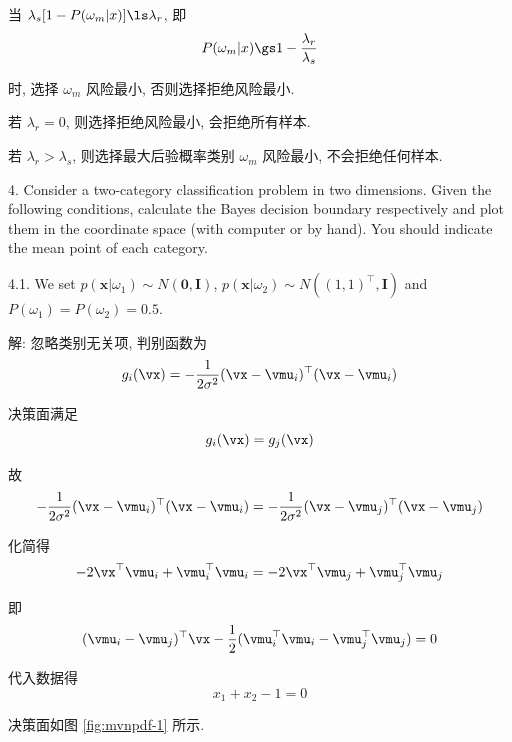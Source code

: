 \documentclass[openany]{ctexbook}
\theoremstyle{kaiti}
\theoremstyle{normal}
\begin{document}
当 $\lambda_s[1-P(\omega_m|x)]\ls\lambda_r$, 即
\begin{equation}
  P(\omega_m|x)\gs1-\frac{\lambda_r}{\lambda_s}
\end{equation}

时, 选择 $\omega_m$ 风险最小, 否则选择拒绝风险最小.

若 $\lambda_r=0$, 则选择拒绝风险最小, 会拒绝所有样本.

若 $\lambda_r>\lambda_s$, 则选择最大后验概率类别 $\omega_m$ 风险最小, 不会拒绝任何样本.

4. Consider a two-category classification problem in two dimensions. Given the following conditions, calculate the Bayes decision boundary respectively and plot them in the coordinate space (with computer or by hand). You should indicate the mean point of each category.

4.1. We set $p(\bm{x}|\omega_1)\sim N(\bm{0},\bm{I})$, $p(\bm{x}|\omega_2)\sim N\left((1,1)^{\top},\bm{I}\right)$ and $P(\omega_1)=P(\omega_2)=0.5$. 

解: 忽略类别无关项, 判别函数为
\begin{equation}
  g_i(\vx)=-\frac{1}{2\sigma^2}(\vx-\vmu_i)^{\top}(\vx-\vmu_i)
\end{equation}

决策面满足
\begin{equation}
  g_i(\vx)=g_j(\vx)
\end{equation}

故
\begin{equation}
  -\frac{1}{2\sigma^2}(\vx-\vmu_i)^{\top}(\vx-\vmu_i)=-\frac{1}{2\sigma^2}(\vx-\vmu_j)^{\top}(\vx-\vmu_j)
\end{equation}

化简得
\begin{equation}
  -2\vx^{\top}\vmu_i+\vmu_i^{\top}\vmu_i=-2\vx^{\top}\vmu_j+\vmu_j^{\top}\vmu_j
\end{equation}

即
\begin{equation}
  (\vmu_i-\vmu_j)^{\top}\vx-\frac{1}{2}(\vmu_i^{\top}\vmu_i-\vmu_j^{\top}\vmu_j)=0
\end{equation}

代入数据得
\begin{equation}
  x_1+x_2-1=0
\end{equation}

决策面如图 \ref{fig:mvnpdf-1} 所示.
\end{document}
